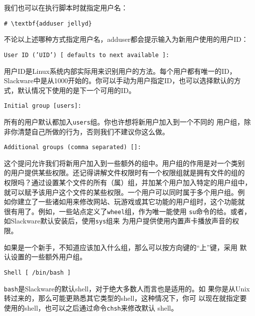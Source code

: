 我们也可以在执行脚本时就指定用户名：
\begin{Verbatim}[frame=single, commandchars=\\\{\}]
# \textbf{adduser jellyd}
\end{Verbatim}

不论以上述哪种方式指定用户名，adduser都会提示输入为新用户使用的用户ID：
\begin{Verbatim}[frame=single, commandchars=\\\{\}]
User ID (’UID’) [ defaults to next available ]:
\end{Verbatim}

用户ID是Linux系统内部实际用来识别用户的方法。每个用户都有唯一的ID，
Slackware中是从1000开始的。你可以手动为用户指定ID，也可以选择默认的方
式，默认情况下使用的是下一个可用的ID。

\begin{Verbatim}[frame=single, commandchars=\\\{\}]
Initial group [users]:
\end{Verbatim}

所有的用户默认都加入\texttt{users}组。你也许想将新用户加入到一个不同的
用户组，除非你清楚自己所做的行为，否则我们不建议你这么做。

\begin{Verbatim}[frame=single, commandchars=\\\{\}]
Additional groups (comma separated) []:
\end{Verbatim}

这个提问允许我们将新用户加入到一些额外的组中。用户组的作用是对一个类别
的用户提供某些权限。还记得讲解文件权限时有一个权限组就是拥有文件的组的
权限吗？通过设置某个文件的所有（属）组，并加某个用户加入特定的用户组中，
就可以赋予该用户这个文件的某些权限。一个用户可以同时属于多个用户组。例
如你建立了一些诸如用来修改网站、玩游戏或其它功能的用户组时，这个功能就
很有用了。例如，一些站点定义了\texttt{wheel}组，作为唯一能使用
\texttt{su}命令的给。或者，如Slackware默认安装后，使用\texttt{sys}组来
为用户提供使用内置声卡播放声音的权限。

如果是一个新手，不知道应该加入什么组，那么可以按方向键的``上''键，采用
默认设置的一些额外用户组。

\begin{Verbatim}[frame=single, commandchars=\\\{\}]
Shell [ /bin/bash ]
\end{Verbatim}

\texttt{bash}是Slackware的默认shell，对于绝大多数人而言也是适用的。如
果你是从Unix转过来的，那么可能更熟悉其它类型的shell，这种情况下，你可
以现在就指定要使用的shell，也可以之后通过命令\texttt{chsh}来修改默认
shell。

